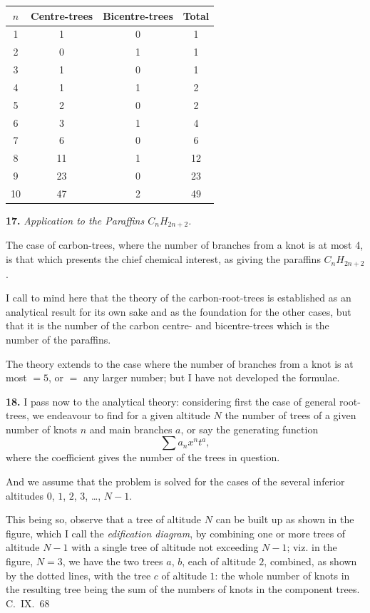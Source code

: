 \documentclass[11pt,a4paper]{article}
\begin{document}
{\begin{center}
\begin{tabular}{|c|c|c|c|}
\hline
$n$ & Centre-trees & Bicentre-trees & Total \\
\hline
1 & 1 & 0 & 1 \\
2 & 0 & 1 & 1 \\
3 & 1 & 0 & 1 \\
4 & 1 & 1 & 2 \\
5 & 2 & 0 & 2 \\
6 & 3 & 1 & 4 \\
7 & 6 & 0 & 6 \\
8 & 11 & 1 & 12 \\
9 & 23 & 0 & 23 \\
10 & 47 & 2 & 49 \\
\hline
\end{tabular}
\end{center}

\medskip
\noindent\textbf{17.}
\textit{Application to the Paraffins $C_nH_{2n+2}$.}

The case of carbon-trees, where the number of branches from a knot is at most 4, is that which presents the chief chemical interest, as giving the paraffins $C_nH_{2n+2}$.

I call to mind here that the theory of the carbon-root-trees is established as an analytical result for its own sake and as the foundation for the other cases, but that it is the number of the carbon centre- and bicentre-trees which is the number of the paraffins.

The theory extends to the case where the number of branches from a knot is at most $=5$, or $=$ any larger number; but I have not developed the formulae.

\medskip
\noindent\textbf{18.}
I pass now to the analytical theory: considering first the case of general root-trees, we endeavour to find for a given altitude $N$ the number of trees of a given number of knots $n$ and main branches $a$, or say the generating function
\[
\sum a_n x^n t^a,
\]
where the coefficient gives the number of the trees in question.

And we assume that the problem is solved for the cases of the several inferior altitudes $0$, $1$, $2$, $3$, \ldots, $N-1$.

This being so, observe that a tree of altitude $N$ can be built up as shown in the figure, which I call the \textit{edification diagram}, by combining one or more trees of altitude $N-1$ with a single tree of altitude not exceeding $N-1$; viz. in the figure, $N = 3$, we have the two trees $a$, $b$, each of altitude $2$, combined, as shown by the dotted lines, with the tree $c$ of altitude $1$: the whole number of knots in the resulting tree being the sum of the numbers of knots in the component trees.
\hfill C.~IX.\ 68

}
\end{document}
